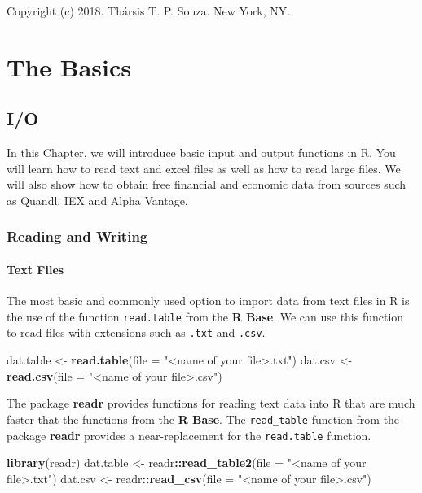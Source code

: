 \documentclass[]{book}
\newenvironment{Shaded}{\begin{snugshade}}{\end{snugshade}}
\newcommand{\KeywordTok}[1]{\textcolor[rgb]{0.13,0.29,0.53}{\textbf{#1}}}
\newcommand{\DataTypeTok}[1]{\textcolor[rgb]{0.13,0.29,0.53}{#1}}
\newcommand{\StringTok}[1]{\textcolor[rgb]{0.31,0.60,0.02}{#1}}
\newcommand{\OperatorTok}[1]{\textcolor[rgb]{0.81,0.36,0.00}{\textbf{#1}}}
\newcommand{\NormalTok}[1]{#1}
\let\BeginKnitrBlock\begin \let\EndKnitrBlock\end
\begin{document}
\BeginKnitrBlock{flushright}
Copyright (c) 2018. Thársis T. P. Souza. New York, NY.
\EndKnitrBlock{flushright}

\part{The Basics}\label{part-the-basics}

\chapter{I/O}\label{io}

In this Chapter, we will introduce basic input and output functions in
R. You will learn how to read text and excel files as well as how to
read large files. We will also show how to obtain free financial and
economic data from sources such as Quandl, IEX and Alpha Vantage.

\section{Reading and Writing}\label{reading-and-writing}

\subsection{Text Files}\label{text-files}

The most basic and commonly used option to import data from text files
in R is the use of the function \texttt{read.table} from the \textbf{R
Base}. We can use this function to read files with extensions such as
\texttt{.txt} and \texttt{.csv}.

\begin{Shaded}
\begin{Highlighting}[]
\NormalTok{dat.table <-}\StringTok{ }\KeywordTok{read.table}\NormalTok{(}\DataTypeTok{file =} \StringTok{"<name of your file>.txt"}\NormalTok{)}
\NormalTok{dat.csv <-}\StringTok{ }\KeywordTok{read.csv}\NormalTok{(}\DataTypeTok{file =} \StringTok{"<name of your file>.csv"}\NormalTok{)}
\end{Highlighting}
\end{Shaded}

The package \textbf{readr} provides functions for reading text data into
R that are much faster that the functions from the \textbf{R Base}. The
\texttt{read\_table} function from the package \textbf{readr} provides a
near-replacement for the \texttt{read.table} function.

\begin{Shaded}
\begin{Highlighting}[]
\KeywordTok{library}\NormalTok{(readr)}
\NormalTok{dat.table <-}\StringTok{ }\NormalTok{readr}\OperatorTok{::}\KeywordTok{read_table2}\NormalTok{(}\DataTypeTok{file =} \StringTok{"<name of your file>.txt"}\NormalTok{)}
\NormalTok{dat.csv <-}\StringTok{ }\NormalTok{readr}\OperatorTok{::}\KeywordTok{read_csv}\NormalTok{(}\DataTypeTok{file =} \StringTok{"<name of your file>.csv"}\NormalTok{)}
\end{Highlighting}
\end{Shaded}
\end{document}

